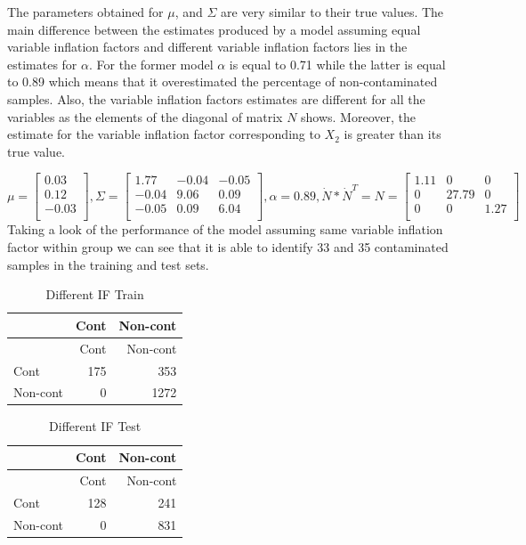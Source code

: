 \documentclass[
]{article}
\begin{document}
The parameters obtained for \(\mu\), and \(\Sigma\) are very similar to
their true values. The main difference between the estimates produced by
a model assuming equal variable inflation factors and different variable
inflation factors lies in the estimates for \(\alpha\). For the former
model \(\alpha\) is equal to 0.71 while the latter is equal to 0.89
which means that it overestimated the percentage of non-contaminated
samples. Also, the variable inflation factors estimates are different
for all the variables as the elements of the diagonal of matrix \(N\)
shows. Moreover, the estimate for the variable inflation factor
corresponding to \(X_{2}\) is greater than its true value.

\[
\mu = \begin{bmatrix}0.03 \\0.12 \\-0.03 \\\end{bmatrix} , \Sigma = \begin{bmatrix}1.77&-0.04&-0.05 \\-0.04&9.06&0.09 \\-0.05&0.09&6.04 \\\end{bmatrix} , \alpha = 0.89, \dot{N} * \dot{N}^{T} = N = \begin{bmatrix}1.11&0&0 \\0&27.79&0 \\0&0&1.27 \\\end{bmatrix}
\] Taking a look of the performance of the model assuming same variable
inflation factor within group we can see that it is able to identify 33
and 35 contaminated samples in the training and test sets.

\begin{longtable}[]{@{}lrr@{}}
\caption{Different IF Train}\tabularnewline
\toprule\noalign{}
& Cont & Non-cont \\
\midrule\noalign{}
\endfirsthead
\toprule\noalign{}
& Cont & Non-cont \\
\midrule\noalign{}
\endhead
\bottomrule\noalign{}
\endlastfoot
Cont & 175 & 353 \\
Non-cont & 0 & 1272 \\
\end{longtable}

\begin{longtable}[]{@{}lrr@{}}
\caption{Different IF Test}\tabularnewline
\toprule\noalign{}
& Cont & Non-cont \\
\midrule\noalign{}
\endfirsthead
\toprule\noalign{}
& Cont & Non-cont \\
\midrule\noalign{}
\endhead
\bottomrule\noalign{}
\endlastfoot
Cont & 128 & 241 \\
Non-cont & 0 & 831 \\
\end{longtable}
\end{document}
